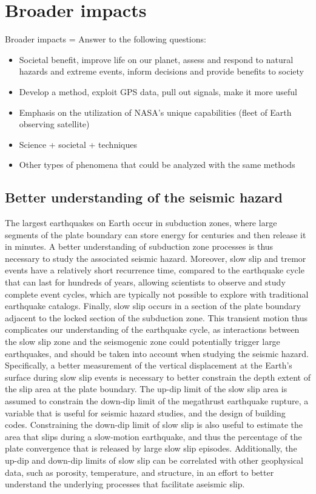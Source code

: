 \documentclass[main.tex]{subfiles}
\begin{document}
\section{Broader impacts}

Broader impacts = Answer to the following questions:
\begin{itemize}
\item Societal benefit, improve life on our planet, assess and respond to natural hazards and extreme events, inform decisions and provide benefits to society
\item Develop a method, exploit GPS data, pull out signals, make it more useful
\item Emphasis on the utilization of NASA's unique capabilities (fleet of Earth observing satellite)
\item Science + societal + techniques
\item Other types of phenomena that could be analyzed with the same methods
\end{itemize}

\subsection{Better understanding of the seismic hazard}

The largest earthquakes on Earth occur in subduction zones, where large segments of the plate boundary can store energy for centuries and then release it in minutes. A better understanding of subduction zone processes is thus necessary to study the associated seismic hazard. Moreover, slow slip and tremor events have a relatively short recurrence time, compared to the earthquake cycle that can last for hundreds of years, allowing scientists to observe and study complete event cycles, which are typically not possible to explore with traditional earthquake catalogs. Finally, slow slip occurs in a section of the plate boundary adjacent to the locked section of the subduction zone. This transient motion thus complicates our understanding of the earthquake cycle, as interactions between the slow slip zone and the seismogenic zone could potentially trigger large earthquakes, and should be taken into account when studying the seismic hazard. \\

Specifically, a better measurement of the vertical displacement at the Earth's surface during slow slip events is necessary to better constrain the depth extent of the slip area at the plate boundary. The up-dip limit of the slow slip area is assumed to constrain the down-dip limit of the megathrust earthquake rupture, a variable that is useful for seismic hazard studies, and the design of building codes. Constraining the down-dip limit of slow slip is also useful to estimate the area that slips during a slow-motion earthquake, and thus the percentage of the plate convergence that is released by large slow slip episodes. Additionally, the up-dip and down-dip limits of slow slip can be correlated with other geophysical data, such as porosity, temperature, and structure, in an effort to better understand the underlying processes that facilitate aseismic slip. \\
\end{document}
